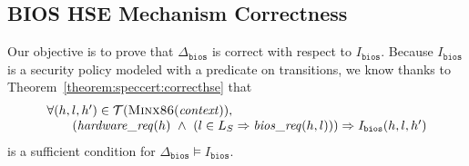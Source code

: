 \subsection{BIOS HSE Mechanism Correctness}
\label{subsec:speccert2:bioshsecorrect}

Our objective is to prove that \( \Delta_{\mathtt{bios}} \) is correct with
respect to \( I_{\mathtt{bios}} \).
%
Because \( I_{\mathtt{bios}} \) is a security policy modeled with a predicate
on transitions, we know thanks to Theorem~\ref{theorem:speccert:correcthse} that
%
\[
  \begin{array}{l}
    \forall (h, l, h') \in \mathcal{T}(\textsc{Minx86}(\mathit{context})), \\
    \qquad (\mathit{hardware\_req}(h)\ \wedge\ (l \in L_S \Rightarrow
    \mathit{bios\_req}(h, l))) \Rightarrow I_{\mathtt{bios}}(h, l, h')
  \end{array}
\]
%
is a sufficient condition for
\( \Delta_{\mathtt{bios}} \models I_{\mathtt{bios}} \).

